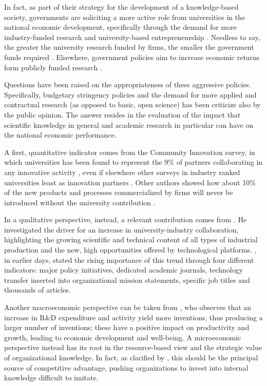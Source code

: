 In fact, as part of their strategy for the development of a knowledge-based society, governments are soliciting a more active role from universities in the national economic development, specifically through the demand for more industry-funded research \citep{Geuna2009} and university-based entrepreneurship \citep{OShea2004}. Needless to say, the greater the university research funded by firms, the smaller the government funds required \citep{Yusuf2008}. Elsewhere, government policies aim to increase economic returns form publicly funded research \citep{Bercovitz2006}.

Questions have been raised on the appropriateness of these aggressive policies. Specifically, budgetary stringency policies and the demand for more applied and contractual research (as opposed to basic, open science) has been criticize also by the public opinion. The answer resides in the evaluation of the impact that scientific knowledge in general and academic research in particular can have on the national economic performance.

A first, quantitative indicator comes from the Community Innovation survey, in which universities has been found to represent the 9\% of partners collaborating in any innovative activity \citep{Muscio2008}, even if elsewhere other surveys in industry ranked universities least as innovation partners \citep{Yusuf2008}. Other authors showed how about 10\% of the new products and processes commercialized by firms will never be introduced without the university contribution \citep{Bekkers2008}. 

In a qualitative perspective, instead, a relevant contribution comes from \citet{Bercovitz2006}. He investigated the driver for an increase in university-industry collaboration, highlighting the growing scientific and technical content of all types of industrial production and the new, high opportunities offered by technological platforms. \citet{Bozeman2000}, in earlier days, stated the rising importance of this trend through four different indicators: major policy initiatives, dedicated academic journals, technology transfer inserted into organizational mission statements, specific job titles and thousands of articles. 

Another macroeconomic perspective can be taken from \citet{Markman2005}, who observes that an increase in R\&D expenditure and activity yield more inventions, thus producing a larger number of inventions; these have a positive impact on productivity and growth, leading to economic development and well-being. A microeconomic perspective instead has its root in the resource-based view \citep{Wernerfelt1984} and the strategic value of organizational knowledge. In fact, as clarified by \citet{Argote2000}, this should be the principal source of competitive advantage, pushing organizations to invest into internal knowledge difficult to imitate.

